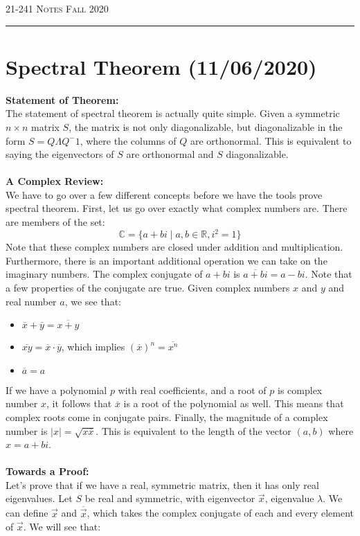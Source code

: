 \documentclass[12pt]{amsart}
\begin{document}
\thispagestyle{empty}

{\scshape 21-241} \hfill {\scshape \Large Notes} \hfill {\scshape Fall 2020}
\medskip
\hrule
\bigskip

\section*{Spectral Theorem (11/06/2020)}
\textbf{Statement of Theorem:}\\
The statement of spectral theorem is actually quite simple. Given a symmetric $n \times n$ matrix $S$, the matrix is not only diagonalizable, but diagonalizable in the form $S=Q\Lambda Q^-1$, where the columns of $Q$ are orthonormal. This is equivalent to saying the eigenvectors of $S$ are orthonormal and $S$ diagonalizable.\\
\\
\textbf{A Complex Review:}\\
We have to go over a few different concepts before we have the tools prove spectral theorem. First, let us go over exactly what complex numbers are. There are members of the set:
\[\mathbb{C} = \{a + bi \mid a, b \in \mathbb{R}, i^2 = 1\}\]
Note that these complex numbers are closed under addition and multiplication. Furthermore, there is an important additional operation we can take on the imaginary numbers. The complex conjugate of $a + bi$ is $\overline{a + bi} = a-bi$. Note that a few properties of the conjugate are true. Given complex numbers $x$ and $y$ and real number $a$, we see that:
\begin{itemize}
	\item $\overline{x} + \overline{y} = \overline{x + y}$
	\item $\overline{xy} = \overline{x}\cdot\overline{y}$, which implies $(\overline{x})^n = \overline{x^n}$
	\item $\overline{a} = a$
\end{itemize}
If we have a polynomial $p$ with real coefficients, and a root of $p$ is complex number $x$, it follows that $\overline{x}$ is a root of the polynomial as well. This means that complex roots come in conjugate pairs. Finally, the magnitude of a complex number is $|x| = \sqrt{x\overline{x}}$. This is equivalent to the length of the vector $(a, b)$ where $x = a + bi$.\\
\\
\textbf{Towards a Proof:}\\
Let's prove that if we have a real, symmetric matrix, then it has only real eigenvalues. Let $S$ be real and symmetric, with eigenvector $\vec{x}$, eigenvalue $\lambda$. We can define $\vec{x}$ and $\overline{\vec{x}}$, which takes the complex conjugate of each and every element of $\vec{x}$. We will see that:
\end{document}
